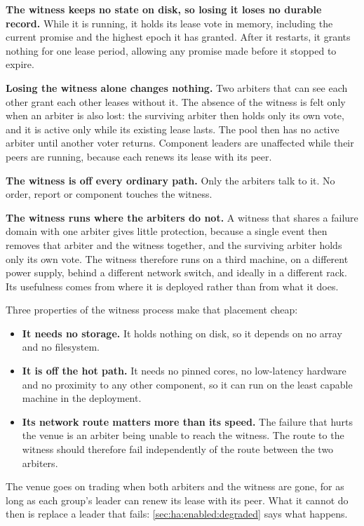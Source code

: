 \textbf{The witness keeps no state on disk, so losing it loses no durable record.}
While it is running, it holds its lease vote in memory, including the current
promise and the highest epoch it has granted. After it restarts, it grants
nothing for one lease period, allowing any promise made before it stopped to
expire.

\textbf{Losing the witness alone changes nothing.} Two arbiters that can see each
other grant each other leases without it. The absence of the witness is felt only
when an arbiter is also lost: the surviving arbiter then holds only its own vote,
and it is active only while its existing lease lasts. The pool then has no active
arbiter until another voter returns. Component leaders are unaffected while their
peers are running, because each renews its lease with its peer.

\textbf{The witness is off every ordinary path.} Only the arbiters talk to it. No
order, report or component touches the witness.

\textbf{The witness runs where the arbiters do not.} A witness that shares a
failure domain with one arbiter gives little protection, because a single event
then removes that arbiter and the witness together, and the surviving arbiter
holds only its own vote. The witness therefore runs on a third machine, on a
different power supply, behind a different network switch, and ideally in a
different rack. Its usefulness comes from where it is deployed rather than from
what it does.

Three properties of the witness process make that placement cheap:

\begin{itemize}[nosep]
  \item \textbf{It needs no storage.} It holds nothing on disk, so it depends on
        no array and no filesystem.
  \item \textbf{It is off the hot path.} It needs no pinned cores, no low-latency
        hardware and no proximity to any other component, so it can run on the
        least capable machine in the deployment.
  \item \textbf{Its network route matters more than its speed.} The failure that
        hurts the venue is an arbiter being unable to reach the witness. The
        route to the witness should therefore fail independently of the route
        between the two arbiters.
\end{itemize}

The venue goes on trading when both arbiters and the witness are gone, for as long
as each group's leader can renew its lease with its peer. What it cannot do then is
replace a leader that fails: \cref{sec:ha:enabled:degraded} says what happens.

